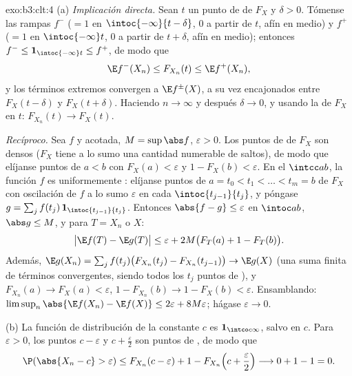 \begin{solution}{exo:b3:clt:4}
(a) \emph{Implicación directa.} Sean $t$ un punto de
 de $F_X$ y
$\delta > 0$. Tómense las rampas
 $f^-$ ($= 1$ en
$\intoc{-\infty}{t-\delta}$, $0$ a partir de $t$, afín en medio) y $f^+$
($= 1$ en $\intoc{-\infty}t$, $0$ a partir de $t + \delta$, afín en
medio); entonces $f^- \leq
\mathbf 1_{\intoc{-\infty}t} \leq f^+$, de modo que
\[
\E f^-(X_n) \leq F_{X_n}(t) \leq \E f^+(X_n),
\]
y los términos extremos convergen a $\E f^\pm(X)$, a su vez encajonados
entre $F_X(t - \delta)$ y $F_X(t + \delta)$. Haciendo $n \to \infty$ y
después $\delta \to 0$, y usando la
 de $F_X$ en $t$:
$F_{X_n}(t) \to F_X(t)$.

\emph{Recíproco.} Sea $f$ 
y acotada, $M =
\sup\abs f$, $\varepsilon > 0$. Los puntos de
 de $F_X$ son densos
($F_X$ tiene a lo sumo una cantidad numerable de saltos), de modo que
elíjanse puntos de 
$a < b$ con $F_X(a) < \varepsilon$ y $1 - F_X(b) < \varepsilon$. En el
 $\intcc ab$, la función $f$
es uniformemente : elíjanse
puntos de 
$a = t_0 < t_1 < \dots < t_m = b$ de $F_X$ con oscilación de $f$ a lo
sumo $\varepsilon$ en cada $\intoc{t_{j-1}}{t_j}$, y póngase $g = \sum_j
f(t_j)\,\mathbf 1_{\intoc{t_{j-1}}{t_j}}$. Entonces $\abs{f - g}
\leq \varepsilon$ en $\intoc ab$, $\abs g \leq M$, y para $T = X_n$ o
$X$:
\[
\bigl|\E f(T) - \E g(T)\bigr| \leq \varepsilon +
2M\bigl(F_T(a) + 1 - F_T(b)\bigr).
\]
Además, $\E g(X_n) = \sum_j f(t_j)\bigl(F_{X_n}(t_j) -
F_{X_n}(t_{j-1})\bigr) \to \E g(X)$ (una suma finita de términos
convergentes, siendo todos los $t_j$ puntos de
), y
$F_{X_n}(a) \to F_X(a) < \varepsilon$, $1 - F_{X_n}(b) \to 1
- F_X(b) < \varepsilon$. Ensamblando:
$\limsup_n\abs{\E f(X_n) - \E f(X)} \leq 2\varepsilon +
8M\varepsilon$; hágase $\varepsilon \to 0$.

(b) La función de distribución de la constante $c$ es
$\mathbf 1_{\intco c\infty}$,
 salvo en $c$. Para
$\varepsilon > 0$, los puntos $c - \varepsilon$ y $c +
\frac\varepsilon2$ son puntos de
, de modo que
\[
\P(\abs{X_n - c} > \varepsilon) \leq F_{X_n}(c -
\varepsilon) + 1 - F_{X_n}\Bigl(c + \frac\varepsilon2\Bigr)
\longrightarrow 0 + 1 - 1 = 0 .
\]
\end{solution}

